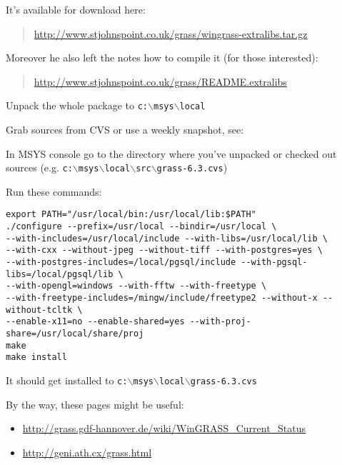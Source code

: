 It's available for download here:

	\begin{quotation}
\url{http://www.stjohnspoint.co.uk/grass/wingrass-extralibs.tar.gz}
	\end{quotation}

Moreover he also left the notes how to compile it (for those interested):

	\begin{quotation}
\url{http://www.stjohnspoint.co.uk/grass/README.extralibs}
	\end{quotation}

Unpack the whole package to \texttt{c:$\backslash$msys$\backslash$local}

\hypertarget{toc68}{}
Grab sources from CVS or use a weekly snapshot, see:

	\begin{quotation}
	\end{quotation}

In MSYS console go to the directory where you've unpacked or checked out sources
(e.g. \texttt{c:$\backslash$msys$\backslash$local$\backslash$src$\backslash$grass-6.3.cvs})

Run these commands:

\begin{verbatim}
export PATH="/usr/local/bin:/usr/local/lib:$PATH"
./configure --prefix=/usr/local --bindir=/usr/local \
--with-includes=/usr/local/include --with-libs=/usr/local/lib \
--with-cxx --without-jpeg --without-tiff --with-postgres=yes \
--with-postgres-includes=/local/pgsql/include --with-pgsql-libs=/local/pgsql/lib \
--with-opengl=windows --with-fftw --with-freetype \
--with-freetype-includes=/mingw/include/freetype2 --without-x --without-tcltk \
--enable-x11=no --enable-shared=yes --with-proj-share=/usr/local/share/proj
make
make install
\end{verbatim}

It should get installed to \texttt{c:$\backslash$msys$\backslash$local$\backslash$grass-6.3.cvs}

By the way, these pages might be useful:

\begin{itemize}
\item \url{http://grass.gdf-hannover.de/wiki/WinGRASS\_Current\_Status}
\item \url{http://geni.ath.cx/grass.html}
\end{itemize}

